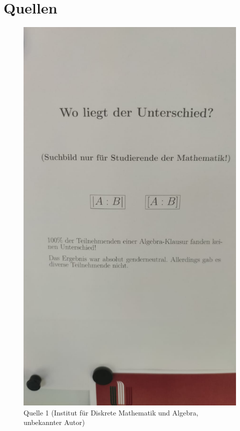 \documentclass[12pt, aspectratio=169]{beamer}
\begin{document}
\section{Quellen}
\begin{frame}
	\centering
	\begin{figure}
		\includegraphics[trim={0 20cm 0 15cm},clip,height=0.8\textheight]{image/geile_quelle.jpeg}
		\caption{Quelle 1 (Institut für Diskrete Mathematik und Algebra, unbekannter Autor)}
	\end{figure}
\end{frame}
\end{document}
